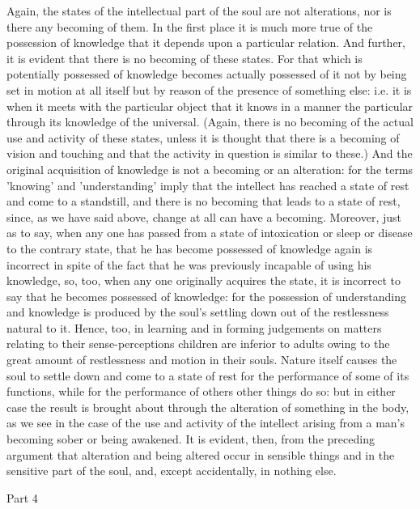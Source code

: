 Again, the states of the intellectual part of the soul are not alterations,
nor is there any becoming of them. In the first place it is much more
true of the possession of knowledge that it depends upon a particular
relation. And further, it is evident that there is no becoming of
these states. For that which is potentially possessed of knowledge
becomes actually possessed of it not by being set in motion at all
itself but by reason of the presence of something else: i.e. it is
when it meets with the particular object that it knows in a manner
the particular through its knowledge of the universal. (Again, there
is no becoming of the actual use and activity of these states, unless
it is thought that there is a becoming of vision and touching and
that the activity in question is similar to these.) And the original
acquisition of knowledge is not a becoming or an alteration: for the
terms 'knowing' and 'understanding' imply that the intellect has reached
a state of rest and come to a standstill, and there is no becoming
that leads to a state of rest, since, as we have said above, change
at all can have a becoming. Moreover, just as to say, when any one
has passed from a state of intoxication or sleep or disease to the
contrary state, that he has become possessed of knowledge again is
incorrect in spite of the fact that he was previously incapable of
using his knowledge, so, too, when any one originally acquires the
state, it is incorrect to say that he becomes possessed of knowledge:
for the possession of understanding and knowledge is produced by the
soul's settling down out of the restlessness natural to it. Hence,
too, in learning and in forming judgements on matters relating to
their sense-perceptions children are inferior to adults owing to the
great amount of restlessness and motion in their souls. Nature itself
causes the soul to settle down and come to a state of rest for the
performance of some of its functions, while for the performance of
others other things do so: but in either case the result is brought
about through the alteration of something in the body, as we see in
the case of the use and activity of the intellect arising from a man's
becoming sober or being awakened. It is evident, then, from the preceding
argument that alteration and being altered occur in sensible things
and in the sensitive part of the soul, and, except accidentally, in
nothing else. 

Part 4

